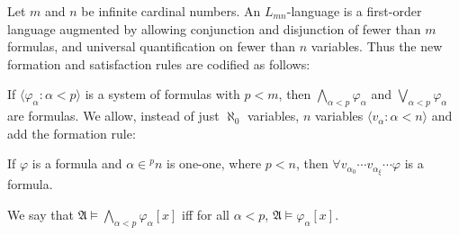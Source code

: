 Let $m$ and $n$ be infinite cardinal numbers. An $L_{mn}$-language is a first-order language augmented by allowing conjunction and disjunction of fewer than $m$ formulas, and universal quantification on fewer than $n$ variables. Thus the new formation and satisfaction rules are codified as follows:

If $\langle \varphi_\alpha : \alpha < p \rangle$ is a system of formulas with $p < m$, then $\bigwedge_{\alpha < p} \varphi_\alpha$ and $\bigvee_{\alpha < p} \varphi_\alpha$ are formulas. We allow, instead of just $\aleph_0$ variables, $n$ variables $\langle v_\alpha : \alpha < n \rangle$ and add the formation rule:

If $\varphi$ is a formula and $\alpha \in {}^p n$ is one-one, where $p < n$, then $\forall v_{\alpha_0} \cdots v_{\alpha_\xi} \cdots \varphi$ is a formula.

We say that $\mathfrak{A} \models \bigwedge_{\alpha < p} \varphi_\alpha[x]$ iff for all $\alpha < p$, $\mathfrak{A} \models \varphi_\alpha[x]$.
